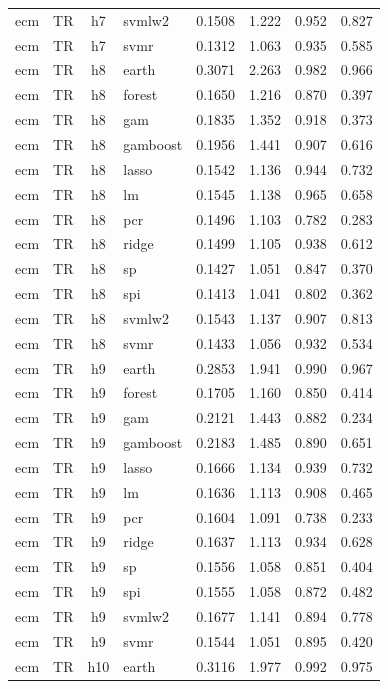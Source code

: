 \begin{ThreePartTable}
\begin{longtable}[t]{llclcccc}
ecm & TR & h7 & svmlw2 & 0.1508 & 1.222 & 0.952 & 0.827\\
ecm & TR & h7 & svmr & 0.1312 & 1.063 & 0.935 & 0.585\\
\addlinespace
ecm & TR & h8 & earth & 0.3071 & 2.263 & 0.982 & 0.966\\
ecm & TR & h8 & forest & 0.1650 & 1.216 & 0.870 & 0.397\\
ecm & TR & h8 & gam & 0.1835 & 1.352 & 0.918 & 0.373\\
ecm & TR & h8 & gamboost & 0.1956 & 1.441 & 0.907 & 0.616\\
ecm & TR & h8 & lasso & 0.1542 & 1.136 & 0.944 & 0.732\\
ecm & TR & h8 & lm & 0.1545 & 1.138 & 0.965 & 0.658\\
ecm & TR & h8 & pcr & 0.1496 & 1.103 & 0.782 & 0.283\\
ecm & TR & h8 & ridge & 0.1499 & 1.105 & 0.938 & 0.612\\
ecm & TR & h8 & sp & 0.1427 & 1.051 & 0.847 & 0.370\\
ecm & TR & h8 & spi & 0.1413 & 1.041 & 0.802 & 0.362\\
ecm & TR & h8 & svmlw2 & 0.1543 & 1.137 & 0.907 & 0.813\\
ecm & TR & h8 & svmr & 0.1433 & 1.056 & 0.932 & 0.534\\
\addlinespace
ecm & TR & h9 & earth & 0.2853 & 1.941 & 0.990 & 0.967\\
ecm & TR & h9 & forest & 0.1705 & 1.160 & 0.850 & 0.414\\
ecm & TR & h9 & gam & 0.2121 & 1.443 & 0.882 & 0.234\\
ecm & TR & h9 & gamboost & 0.2183 & 1.485 & 0.890 & 0.651\\
ecm & TR & h9 & lasso & 0.1666 & 1.134 & 0.939 & 0.732\\
ecm & TR & h9 & lm & 0.1636 & 1.113 & 0.908 & 0.465\\
ecm & TR & h9 & pcr & 0.1604 & 1.091 & 0.738 & 0.233\\
ecm & TR & h9 & ridge & 0.1637 & 1.113 & 0.934 & 0.628\\
ecm & TR & h9 & sp & 0.1556 & 1.058 & 0.851 & 0.404\\
ecm & TR & h9 & spi & 0.1555 & 1.058 & 0.872 & 0.482\\
ecm & TR & h9 & svmlw2 & 0.1677 & 1.141 & 0.894 & 0.778\\
ecm & TR & h9 & svmr & 0.1544 & 1.051 & 0.895 & 0.420\\
\addlinespace
ecm & TR & h10 & earth & 0.3116 & 1.977 & 0.992 & 0.975\\

\end{longtable}
\end{ThreePartTable}
